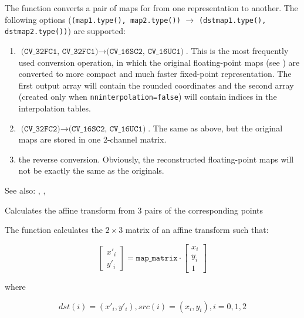 The function converts a pair of maps for  from one representation to another. The following options (\texttt{(map1.type(), map2.type())} $\rightarrow$ \texttt{(dstmap1.type(), dstmap2.type())}) are supported:
\begin{enumerate}
    \item $\texttt{(CV\_32FC1, CV\_32FC1)} \rightarrow \texttt{(CV\_16SC2, CV\_16UC1)}$. This is the most frequently used conversion operation, in which the original floating-point maps (see ) are converted to more compact and much faster fixed-point representation. The first output array will contain the rounded coordinates and the second array (created only when \texttt{nninterpolation=false}) will contain indices in the interpolation tables.   
    \item $\texttt{(CV\_32FC2)} \rightarrow \texttt{(CV\_16SC2, CV\_16UC1)}$. The same as above, but the original maps are stored in one 2-channel matrix.
    \item the reverse conversion. Obviously, the reconstructed floating-point maps will not be exactly the same as the originals.
\end{enumerate} 

See also: , , 

Calculates the affine transform from 3 pairs of the corresponding points


\begin{description}
\end{description}

The function calculates the $2 \times 3$ matrix of an affine transform such that:

\[
\begin{bmatrix}
x'_i\\
y'_i
\end{bmatrix}
=
\texttt{map\_matrix}
\cdot
\begin{bmatrix}
x_i\\
y_i\\
1
\end{bmatrix}
\]

where

\[
dst(i)=(x'_i,y'_i),
src(i)=(x_i, y_i),
i=0,1,2
\]

